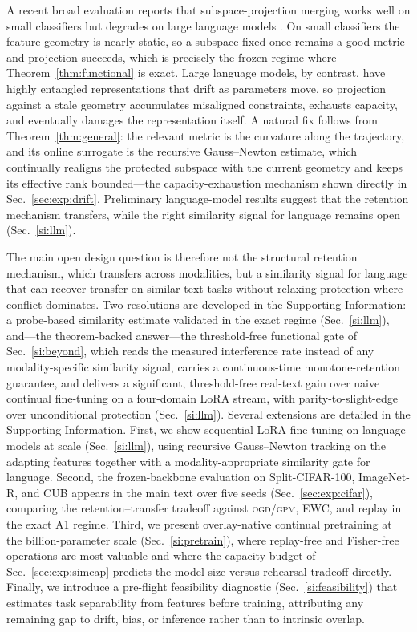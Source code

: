 \documentclass[10pt,a4paper]{article}
\theoremstyle{plain}
\theoremstyle{definition}
\newcommand{\OGD}{\textsc{ogd}}
\begin{document}
A recent broad evaluation reports that subspace-projection merging works well on small
classifiers but degrades on large language models \cite{merging2025llm}.
On small classifiers the feature geometry is nearly
static, so a subspace fixed once remains a good metric and projection succeeds, which is
precisely the frozen regime where Theorem~\ref{thm:functional} is exact. Large
language models, by contrast, have highly entangled representations that drift as
parameters move, so projection against a stale geometry accumulates misaligned
constraints, exhausts capacity, and eventually damages the representation itself. A
natural fix follows from Theorem~\ref{thm:general}: the relevant metric is the curvature
along the trajectory, and its online surrogate is the recursive Gauss--Newton estimate,
which continually realigns the protected subspace with the current geometry and keeps its
effective rank bounded---the capacity-exhaustion mechanism shown directly in
Sec.~\ref{sec:exp:drift}. Preliminary language-model results suggest that the retention
mechanism transfers, while the right similarity signal for language remains open
(Sec.~\ref{si:llm}).

The main open design question is therefore not the structural retention mechanism, which
transfers across modalities, but a similarity signal for language that can recover
transfer on similar text tasks without relaxing protection where conflict
dominates. Two resolutions are developed in the Supporting Information: a probe-based
similarity estimate validated in the exact regime (Sec.~\ref{si:llm}), and---the
theorem-backed answer---the threshold-free functional gate of Sec.~\ref{si:beyond}, which
reads the measured interference rate instead of any modality-specific similarity signal,
carries a continuous-time monotone-retention guarantee, and delivers a significant,
threshold-free real-text gain over naive continual fine-tuning on a four-domain LoRA
stream, with parity-to-slight-edge over unconditional protection (Sec.~\ref{si:llm}). Several extensions are detailed in
the Supporting Information. First, we show sequential LoRA fine-tuning on language
models at scale (Sec.~\ref{si:llm}), using recursive Gauss--Newton tracking on the adapting
features together with a modality-appropriate similarity gate for language. Second, the
frozen-backbone evaluation on Split-CIFAR-100, ImageNet-R, and CUB appears in the main text
over five seeds (Sec.~\ref{sec:exp:cifar}), comparing the retention--transfer tradeoff
against \OGD{}/\textsc{gpm}, EWC, and replay in the exact A1 regime. Third, we present
overlay-native continual pretraining at the billion-parameter scale (Sec.~\ref{si:pretrain}),
where replay-free and Fisher-free operations are most valuable and where the capacity budget
of Sec.~\ref{sec:exp:simcap} predicts the model-size-versus-rehearsal tradeoff directly.
Finally, we introduce a pre-flight feasibility diagnostic (Sec.~\ref{si:feasibility}) that
estimates task separability from features before training, attributing any remaining gap to
drift, bias, or inference rather than to intrinsic overlap.
\end{document}
